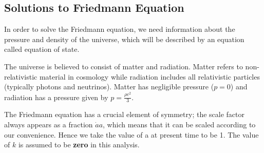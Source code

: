 \subsection{Solutions to Friedmann Equation}
In order to solve the Friedmann equation, we need information about the pressure and density of the universe, which will be described by an equation called equation of state. 

The universe is believed to consist of matter and radiation. Matter refers to non-relativistic material in cosmology while radiation includes all relativistic particles (typically photons and neutrinos). Matter has negligible pressure ($p = 0$) and radiation has a pressure given by $p = \frac{{\rho}c^2}{3}$.

The Friedmann equation has a crucial element of symmetry; the scale factor always appears as a fraction ${\dot{a}}{a}$, which means that it can be scaled according to our convenience. Hence we take the value of a at present time to be 1. The value of $k$ is assumed to be \textbf{zero} in this analysis. 

